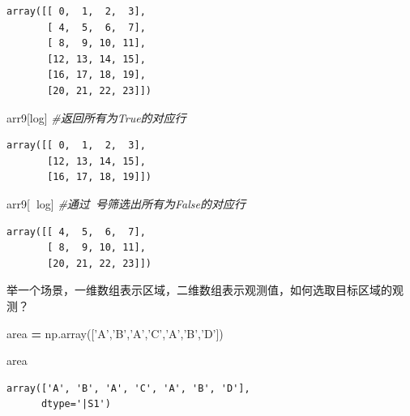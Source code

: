 \documentclass[]{article}
\newenvironment{Shaded}{\begin{snugshade}}{\end{snugshade}}
\newcommand{\StringTok}[1]{\textcolor[rgb]{0.31,0.60,0.02}{#1}}
\newcommand{\CommentTok}[1]{\textcolor[rgb]{0.56,0.35,0.01}{\textit{#1}}}
\newcommand{\OperatorTok}[1]{\textcolor[rgb]{0.81,0.36,0.00}{\textbf{#1}}}
\newcommand{\NormalTok}[1]{#1}
\begin{document}
\begin{verbatim}
array([[ 0,  1,  2,  3],
       [ 4,  5,  6,  7],
       [ 8,  9, 10, 11],
       [12, 13, 14, 15],
       [16, 17, 18, 19],
       [20, 21, 22, 23]])
\end{verbatim}

\begin{Shaded}
\begin{Highlighting}[]
\NormalTok{arr9[log] }\CommentTok{#返回所有为True的对应行}
\end{Highlighting}
\end{Shaded}

\begin{verbatim}
array([[ 0,  1,  2,  3],
       [12, 13, 14, 15],
       [16, 17, 18, 19]])
\end{verbatim}

\begin{Shaded}
\begin{Highlighting}[]
\NormalTok{arr9[}\OperatorTok{~}\NormalTok{log] }\CommentTok{#通过~号筛选出所有为False的对应行}
\end{Highlighting}
\end{Shaded}

\begin{verbatim}
array([[ 4,  5,  6,  7],
       [ 8,  9, 10, 11],
       [20, 21, 22, 23]])
\end{verbatim}

举一个场景，一维数组表示区域，二维数组表示观测值，如何选取目标区域的观测？

\begin{Shaded}
\begin{Highlighting}[]
\NormalTok{area }\OperatorTok{=}\NormalTok{ np.array([}\StringTok{'A'}\NormalTok{,}\StringTok{'B'}\NormalTok{,}\StringTok{'A'}\NormalTok{,}\StringTok{'C'}\NormalTok{,}\StringTok{'A'}\NormalTok{,}\StringTok{'B'}\NormalTok{,}\StringTok{'D'}\NormalTok{])}
\end{Highlighting}
\end{Shaded}

\begin{Shaded}
\begin{Highlighting}[]
\NormalTok{area}
\end{Highlighting}
\end{Shaded}

\begin{verbatim}
array(['A', 'B', 'A', 'C', 'A', 'B', 'D'], 
      dtype='|S1')
\end{verbatim}
\end{document}
